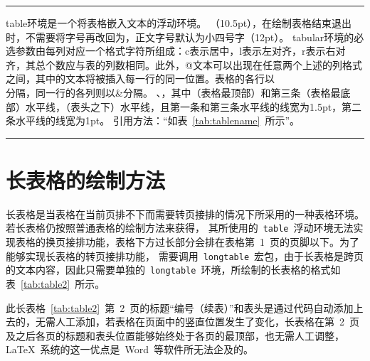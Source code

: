 \noindent\hrule

\begin{VerbWithBreak}
table环境是一个将表格嵌入文本的浮动环境。
（10.5pt），在绘制表格结束退出时，不需要将字号再改回为\xiaosi，正文字号默认为小四号字（12pt）。
tabular环境的必选参数由每列对应一个格式字符所组成：c表示居中，l表示左对齐，r表示右对齐，其总个数应与表的列数相同。此外，@{文本}可以出现在任意两个上述的列格式之间，其中的文本将被插入每一行的同一位置。表格的各行以\\分隔，同一行的各列则以&分隔。
\toprule、，其中（表格最顶部）和第三条（表格最底部）水平线，（表头之下）水平线，且第一条和第三条水平线的线宽为1.5pt，第二条水平线的线宽为1pt。
引用方法：“如表~\ref{tab:tablename}~所示”。
\end{VerbWithBreak}

\noindent\hrule

\section{长表格的绘制方法}

长表格是当表格在当前页排不下而需要转页接排的情况下所采用的一种表格环境。若长表格仍按照普通表格的绘制方法来获得，
其所使用的~\verb|table|~浮动环境无法实现表格的换页接排功能，表格下方过长部分会排在表格第~1~页的页脚以下。为了能够实现长表格的转页接排功能，
需要调用~\verb|longtable|~宏包，由于长表格是跨页的文本内容，因此只需要单独的~\verb|longtable|~环境，所绘制的长表格的格式如表~\ref{tab:table2}~所示。

此长表格~\ref{tab:table2}~第~2~页的标题“编号（续表）”和表头是通过代码自动添加上去的，无需人工添加，若表格在页面中的竖直位置发生了变化，长表格在第~2~页
及之后各页的标题和表头位置能够始终处于各页的最顶部，也无需人工调整，\LaTeX~系统的这一优点是~Word~等软件所无法企及的。

